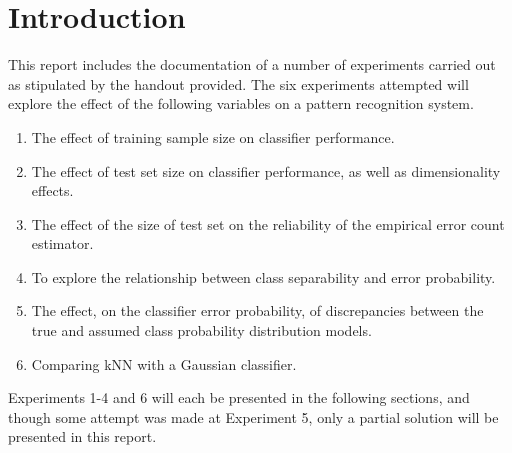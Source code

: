 \section{Introduction}\label{s:intro}
This report includes the documentation of a number of experiments carried out as stipulated by the handout provided. The six experiments attempted will explore the effect of the following variables on a pattern recognition system.

\begin{enumerate}
	\item The effect of training sample size on classifier performance.
	\item The effect of test set size on classifier performance, as well as dimensionality effects.
	\item The effect of the size of test set on the reliability of the empirical error count estimator.
	\item To explore the relationship between class separability and error probability.
	\item The effect, on the classifier error probability, of discrepancies between the true and assumed class probability distribution models.
	\item Comparing kNN with a Gaussian classifier.
\end{enumerate}

Experiments 1-4 and 6 will each be presented in the following sections, and though some attempt was made at Experiment 5, only a partial solution will be presented in this report.

%
